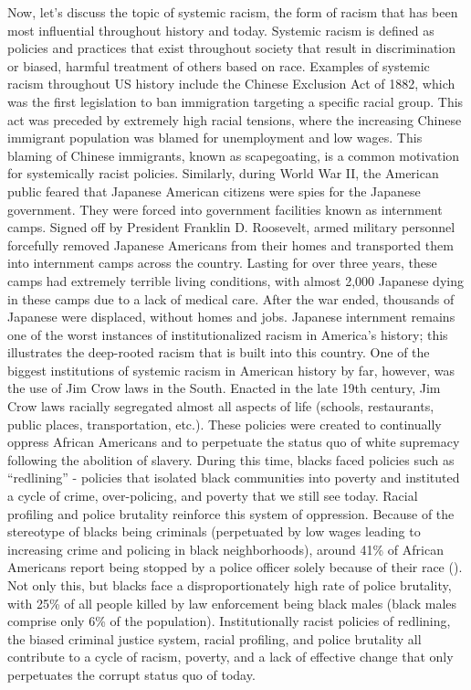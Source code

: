 \documentclass[12pt, a4paper, twoside]{article}
\begin{document}
Now, let's discuss the topic of systemic racism, the form of racism that has been most influential throughout history and today. Systemic racism is defined as policies and practices that exist throughout society that result in discrimination or biased, harmful treatment of others based on race. Examples of systemic racism throughout US history include the Chinese Exclusion Act of 1882, which was the first legislation to ban immigration targeting a specific racial group. This act was preceded by extremely high racial tensions, where the increasing Chinese immigrant population was blamed for unemployment and low wages. This blaming of Chinese immigrants, known as scapegoating, is a common motivation for systemically racist policies. Similarly, during World War II, the American public feared that Japanese American citizens were spies for the Japanese government. They were forced into government facilities known as internment camps. Signed off by President Franklin D. Roosevelt, armed military personnel forcefully removed Japanese Americans from their homes and transported them into internment camps across the country. Lasting for over three years, these camps had extremely terrible living conditions, with almost 2,000 Japanese dying in these camps due to a lack of medical care. After the war ended, thousands of Japanese were displaced, without homes and jobs. Japanese internment remains one of the worst instances of institutionalized racism in America’s history; this illustrates the deep-rooted racism that is built into this country. One of the biggest institutions of systemic racism in American history by far, however, was the use of Jim Crow laws in the South. Enacted in the late 19th century, Jim Crow laws racially segregated almost all aspects of life (schools, restaurants, public places, transportation, etc.). These policies were created to continually oppress African Americans and to perpetuate the status quo of white supremacy following the abolition of slavery. During this time, blacks faced policies such as “redlining” - policies that isolated black communities into poverty and instituted a cycle of crime, over-policing, and poverty that we still see today. Racial profiling and police brutality reinforce this system of oppression. Because of the stereotype of blacks being criminals (perpetuated by low wages leading to increasing crime and policing in black neighborhoods), around 41\% of African Americans report being stopped by a police officer solely because of their race (\cite{stewart2024}). Not only this, but blacks face a disproportionately high rate of police brutality, with 25\% of all people killed by law enforcement being black males (black males comprise only 6\% of the population). Institutionally racist policies of redlining, the biased criminal justice system, racial profiling, and police brutality all contribute to a cycle of racism, poverty, and a lack of effective change that only perpetuates the corrupt status quo of today.
\end{document}
